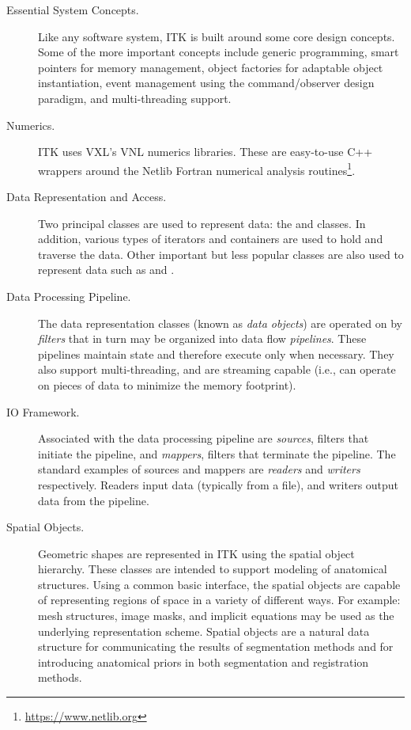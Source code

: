 \begin{description}
  \item[Essential System Concepts.] Like any software system, ITK is
        built around some core design concepts. Some of the more important
        concepts include generic programming, smart pointers for memory
        management, object factories for adaptable object instantiation,
        event management using the command/observer design paradigm, and
        multi-threading support.

  \item[Numerics.] ITK uses VXL's VNL numerics libraries. These are
        easy-to-use C++ wrappers around the Netlib Fortran numerical
        analysis routines\footnote{\url{https://www.netlib.org}}.

  \item[Data Representation and Access.] Two principal classes are
        used to represent data: the  and 
        classes. In addition, various types of iterators and containers are
        used to hold and traverse the data. Other important but less popular
        classes are also used to represent data such as  and
        .

  \item[Data Processing Pipeline.] The data representation
    classes (known as \emph{data objects}) are operated on by
    \emph{filters} that in turn may be organized into data flow
    \emph{pipelines}. These pipelines maintain state and therefore
    execute only when necessary.  They also support
    multi-threading, and are streaming capable (i.e., can operate
    on pieces of data to minimize the memory footprint).

    \item[IO Framework.] Associated with the data processing
        pipeline are \emph{sources}, filters that initiate the
        pipeline, and \emph{mappers}, filters that terminate the
        pipeline.  The standard examples of sources and mappers are
        \emph{readers} and \emph{writers} respectively. Readers
        input data (typically from a file), and writers output data
        from the pipeline.

  \item[Spatial Objects.] Geometric shapes are represented in ITK using
        the spatial object hierarchy. These classes are intended to support
        modeling of anatomical structures. Using a common basic interface,
        the spatial objects are capable of representing regions of space in a
        variety of different ways. For example: mesh structures, image masks,
        and implicit equations may be used as the underlying representation
        scheme. Spatial objects are a natural data structure for
        communicating the results of segmentation methods and for introducing
        anatomical priors in both segmentation and registration methods.


\end{description}
